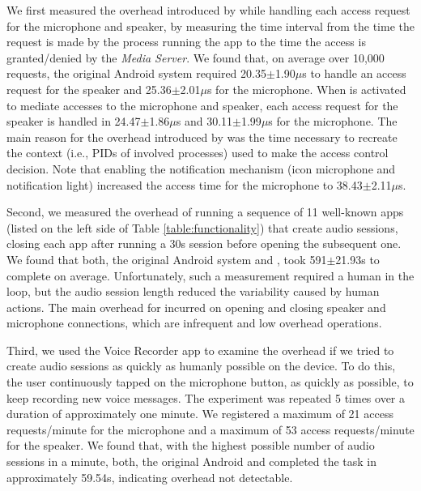 We first measured the overhead introduced by \system while handling each access request for the microphone and speaker, by measuring the time interval from the time the request is made by the process running the app to the time the access is granted/denied by the \emph{Media Server}. We found that, on average over 10,000 requests, the original Android system required 20.35$\pm$1.90$\mu$s to handle an access request for the speaker and 25.36$\pm$2.01$\mu$s for the microphone. When \system is activated to mediate accesses to the microphone and speaker, each access request for the speaker is handled in 24.47$\pm$1.86$\mu$s and 30.11$\pm$1.99$\mu$s for the microphone. The main reason for the overhead introduced by \system was the time necessary to recreate the context (i.e., PIDs of involved processes) used to make the access control decision. Note that enabling the \system notification mechanism (icon microphone and notification light) increased the access time for the microphone to 38.43$\pm$2.11$\mu$s.

Second, we measured the overhead of running a sequence of 11 well-known apps (listed on the left side of Table \ref{table:functionality}) that create audio sessions, closing each app after running a 30s session before opening the subsequent one. We found that both, the original Android system and \system, took 591$\pm$21.93s to complete on average.  Unfortunately, such a measurement required a human in the loop, but the audio session length reduced the variability caused by human actions.  The main overhead for \system incurred on opening and closing speaker and microphone connections, which are infrequent and low overhead operations.

Third, we used the Voice Recorder app to examine the overhead if we tried to create audio sessions as quickly as humanly possible on the device.  To do this, the user continuously tapped on the microphone button, as quickly as possible, to keep recording new voice messages. The experiment was repeated 5 times over a duration of approximately one minute. We registered a maximum of 21 access requests/minute for the microphone and a maximum of 53 access requests/minute for the speaker. We found that, with the highest possible number of audio sessions in a minute, both, the original Android and \system completed the task in approximately 59.54s, indicating overhead not detectable.




 



